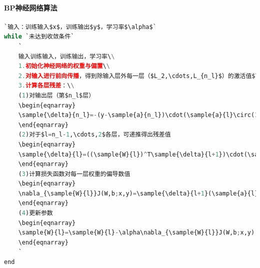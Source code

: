 \paragraph{BP神经网络算法}
\begin{lstlisting}[language=python]
`输入：训练输入$x$，训练输出$y$，学习率$\alpha$`
while `未达到收敛条件`
    `
	输入训练输入，训练输出，学习率\\
	1.初始化神经网络的权重与偏置\\
	2.对输入进行前向传播，得到除输入层外每一层（$L_2,\cdots,L_{n_l}$）的激活值$\sample{a}{2},\cdots,\sample{a}{n_l}$\\
	3.计算各层残差：\\
	(1)对输出层（第$n_l$层）
	\begin{eqnarray}
	\sample{\delta}{n_l}=-(y-\sample{a}{n_l})\cdot(\sample{a}{l}\circ(1-\sample{a}{l}))
	\end{eqnarray}
	(2)对于$l=n_l-1,\cdots,2$各层，可递推得出残差值
	\begin{eqnarray}
	\sample{\delta}{l}=((\sample{W}{l})^T\sample{\delta}{l+1})\cdot(\sample{a}{l})
	\end{eqnarray}
	(3)计算损失函数对每一层权重的偏导数值
	\begin{eqnarray}
	\nabla_{\sample{W}{l}}J(W,b;x,y)=\sample{\delta}{l+1}(\sample{a}{l})^T
	\end{eqnarray}
	(4)更新参数
	\begin{eqnarray}
	\sample{W}{l}=\sample{W}{l}-\alpha\nabla_{\sample{W}{l}}J(W,b;x,y)
	\end{eqnarray}
    `
end

\end{lstlisting}

